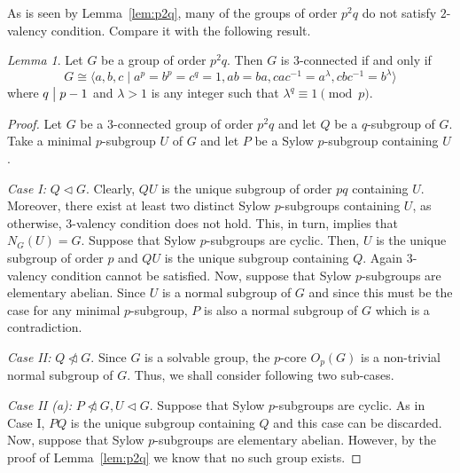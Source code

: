 \documentclass[a4paper,12pt]{article}
\theoremstyle{definition}
\theoremstyle{remark}
\theoremstyle{theorem}
\newtheorem{lem}[theorem]{Lemma}
\newcommand{\divides}{\bigm|}
\begin{document}
As is seen by Lemma~\ref{lem:p2q}, many of the groups of order $p^2q$ do not satisfy $2$-valency condition. Compare it with the following result.

\begin{lem}\label{lem:p2q-2}
  Let $G$ be a group of order $p^2q$. Then $G$ is $3$-connected if and
  only if
	 $$G\cong \langle a,b,c\mid a^p=b^p=c^q=1, ab=ba, cac^{-1}=a^{\lambda}, cbc^{-1}=b^{\lambda} \rangle $$ 
         where $q\divides  p-1$ and $\lambda>1$ is any integer such
         that $\lambda^q\equiv 1 \pmod{p}$.
\end{lem}

\begin{proof}
  Let $G$ be a $3$-connected group of order $p^2q$ and let $Q$ be a
  $q$-subgroup of $G$. Take a minimal $p$-subgroup $U$ of $G$ and let
  $P$ be a Sylow $p$-subgroup containing $U$.

  \emph{Case I:} $Q\triangleleft G$. Clearly, $QU$ is the unique
  subgroup of order $pq$ containing $U$. Moreover, there exist at
  least two distinct Sylow $p$-subgroups containing $U$, as otherwise,
  $3$-valency condition does not hold. This, in turn, implies that
  $N_G(U)=G$. Suppose that Sylow $p$-subgroups are
  cyclic. Then, $U$ is the unique subgroup of order $p$ and $QU$ is
  the unique subgroup containing $Q$. Again $3$-valency condition
  cannot be satisfied. Now, suppose that Sylow $p$-subgroups are
  elementary abelian. Since $U$ is a normal subgroup of $G$ and since
  this must be the case for any minimal $p$-subgroup, $P$ is also a
  normal subgroup of $G$ which is a contradiction.

  \emph{Case II:} $Q\ntriangleleft G$. Since $G$ is a solvable group,
  the $p$-core $O_p(G)$ is a non-trivial normal subgroup of
  $G$. Thus, we shall consider following two sub-cases.

  \emph{Case II (a):} $P\ntriangleleft G, U\triangleleft G$. Suppose
  that Sylow $p$-subgroups are cyclic. As in Case I, $PQ$ is the
  unique subgroup containing $Q$ and this case can be discarded. Now,
  suppose that Sylow $p$-subgroups are elementary abelian. However, by
  the proof of Lemma~\ref{lem:p2q} we know that no such group exists.



\end{proof}
\end{document}
